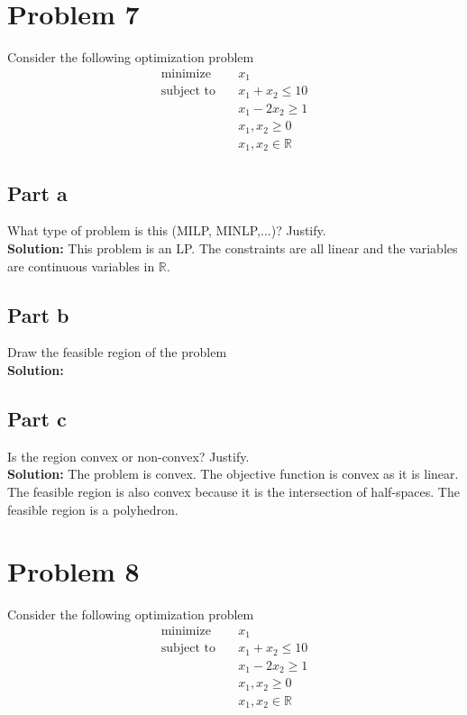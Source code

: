 \documentclass[11pt]{article}
\begin{document}
\section{Problem 7}
Consider the following optimization problem
\begin{align}
  \text{minimize} & \quad x_1 \\
  \text{subject to} & \quad x_1 + x_2 \leq 10 \\
  & \quad x_1 - 2x_2 \geq 1 \\
  & \quad x_1, x_2 \geq 0 \\
  & \quad x_1, x_2 \in \mathbb{R}
\end{align}

\subsection{Part a}
What type of problem is this (MILP, MINLP,...)? Justify.
\\
\textbf{Solution: }
This problem is an LP. The constraints are all linear and the variables are continuous variables in $\mathbb{R}$.

\subsection{Part b}
Draw the feasible region of the problem
\\
\textbf{Solution: }


\subsection{Part c}
Is the region convex or non-convex? Justify.
\\
\textbf{Solution: }
The problem is convex. 
The objective function is convex as it is linear. 
The feasible region is also convex because it is the intersection of half-spaces.
The feasible region is a polyhedron.

\section{Problem 8}Consider the following optimization problem
\begin{align}
  \text{minimize} & \quad x_1 \\
  \text{subject to} & \quad x_1 + x_2 \leq 10 \\
  & \quad x_1 - 2x_2 \geq 1 \\
  & \quad x_1, x_2 \geq 0 \\
  & \quad x_1, x_2 \in \mathbb{R}
\end{align}
\end{document}
